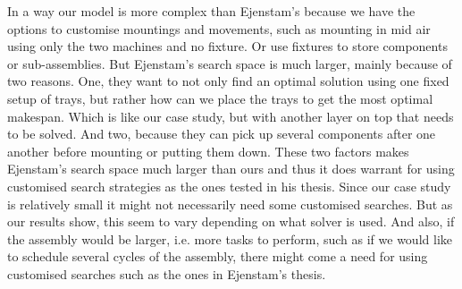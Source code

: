 In a way our model is more complex than Ejenstam's because we have the options to customise mountings and movements, such as mounting in mid air using only the two machines and no fixture. Or use fixtures to store components or sub-assemblies. But Ejenstam's search space is much larger, mainly because of two reasons. One, they want to not only find an optimal solution using one fixed setup of trays, but rather how can we place the trays to get the most optimal makespan. Which is like our case study, but with another layer on top that needs to be solved. And two, because they can pick up several components after one another before mounting or putting them down. These two factors makes Ejenstam's search space much larger than ours and thus it does warrant for using customised search strategies as the ones tested in his thesis. Since our case study is relatively small it might not necessarily need some customised searches. But as our results show, this seem to vary depending on what solver is used. And also, if the assembly would be larger, i.e. more tasks to perform, such as if we would like to schedule several cycles of the assembly, there might come a need for using customised searches such as the ones in Ejenstam's thesis.

